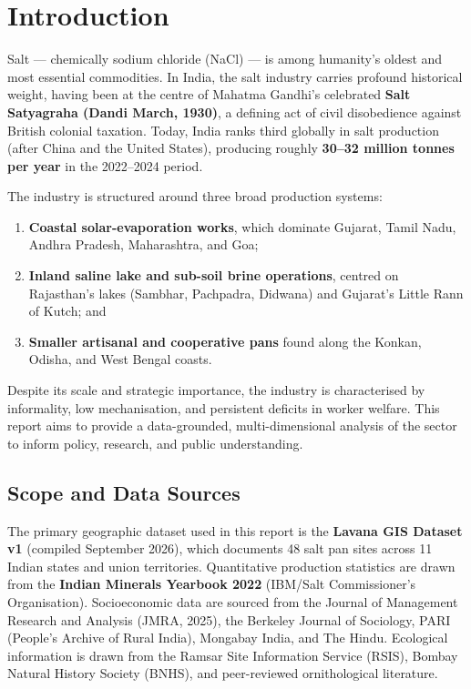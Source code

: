 \documentclass[12pt,a4paper]{article}
\begin{document}
\tableofcontents
\clearpage

\section{Introduction}

Salt — chemically sodium chloride (NaCl) — is among humanity's oldest and most
essential commodities. In India, the salt industry carries profound historical weight,
having been at the centre of Mahatma Gandhi's celebrated \textbf{Salt Satyagraha
(Dandi March, 1930)}, a defining act of civil disobedience against British colonial
taxation. Today, India ranks third globally in salt production (after China and the
United States), producing roughly \textbf{30--32 million tonnes per year} in the
2022--2024 period.

The industry is structured around three broad production systems:
\begin{enumerate}[leftmargin=*, label=(\roman*)]
  \item \textbf{Coastal solar-evaporation works}, which dominate Gujarat, Tamil Nadu,
        Andhra Pradesh, Maharashtra, and Goa;
  \item \textbf{Inland saline lake and sub-soil brine operations}, centred on
        Rajasthan's lakes (Sambhar, Pachpadra, Didwana) and Gujarat's Little Rann
        of Kutch; and
  \item \textbf{Smaller artisanal and cooperative pans} found along the Konkan,
        Odisha, and West Bengal coasts.
\end{enumerate}

Despite its scale and strategic importance, the industry is characterised by informality,
low mechanisation, and persistent deficits in worker welfare. This report aims to provide
a data-grounded, multi-dimensional analysis of the sector to inform policy, research,
and public understanding.

\subsection{Scope and Data Sources}

The primary geographic dataset used in this report is the \textbf{Lavana GIS Dataset v1}
(compiled September 2026), which documents 48 salt pan sites across 11 Indian states and
union territories. Quantitative production statistics are drawn from the
\textbf{Indian Minerals Yearbook 2022} (IBM/Salt Commissioner's Organisation).
Socioeconomic data are sourced from the Journal of Management Research and Analysis
(JMRA, 2025), the Berkeley Journal of Sociology, PARI (People's Archive of Rural India),
Mongabay India, and The Hindu. Ecological information is drawn from the Ramsar Site
Information Service (RSIS), Bombay Natural History Society (BNHS), and peer-reviewed
ornithological literature.
\end{document}
